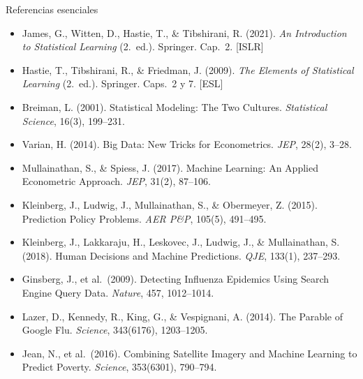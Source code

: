 \documentclass{beamer}
\newcommand{\1}{\mathbb{I}}
\begin{document}
\begin{frame}{Referencias esenciales}
\footnotesize
\begin{itemize}\itemsep2pt
  \item James, G., Witten, D., Hastie, T., \& Tibshirani, R. (2021). \emph{An Introduction to Statistical Learning} (2.\ ed.). Springer. Cap.\ 2. [ISLR]
  \item Hastie, T., Tibshirani, R., \& Friedman, J. (2009). \emph{The Elements of Statistical Learning} (2.\ ed.). Springer. Caps.\ 2 y 7. [ESL]
  \item Breiman, L. (2001). Statistical Modeling: The Two Cultures. \emph{Statistical Science}, 16(3), 199--231.
  \item Varian, H. (2014). Big Data: New Tricks for Econometrics. \emph{JEP}, 28(2), 3--28.
  \item Mullainathan, S., \& Spiess, J. (2017). Machine Learning: An Applied Econometric Approach. \emph{JEP}, 31(2), 87--106.
  \item Kleinberg, J., Ludwig, J., Mullainathan, S., \& Obermeyer, Z. (2015). Prediction Policy Problems. \emph{AER P\&P}, 105(5), 491--495.
  \item Kleinberg, J., Lakkaraju, H., Leskovec, J., Ludwig, J., \& Mullainathan, S. (2018). Human Decisions and Machine Predictions. \emph{QJE}, 133(1), 237--293.
  \item Ginsberg, J., et al.\ (2009). Detecting Influenza Epidemics Using Search Engine Query Data. \emph{Nature}, 457, 1012--1014.
  \item Lazer, D., Kennedy, R., King, G., \& Vespignani, A. (2014). The Parable of Google Flu. \emph{Science}, 343(6176), 1203--1205.
  \item Jean, N., et al.\ (2016). Combining Satellite Imagery and Machine Learning to Predict Poverty. \emph{Science}, 353(6301), 790--794.
\end{itemize}
\normalsize
\end{frame}

\end{document}
